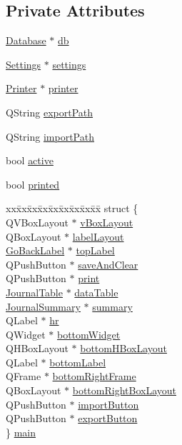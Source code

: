 \subsection*{Private Attributes}
\begin{CompactItemize}
\item 
\hyperlink{classDatabase}{Database} $\ast$ \hyperlink{classJournalStack_r0}{db}
\item 
\hyperlink{classSettings}{Settings} $\ast$ \hyperlink{classJournalStack_r1}{settings}
\item 
\hyperlink{classPrinter}{Printer} $\ast$ \hyperlink{classJournalStack_r2}{printer}
\item 
QString \hyperlink{classJournalStack_r3}{export\-Path}
\item 
QString \hyperlink{classJournalStack_r4}{import\-Path}
\item 
bool \hyperlink{classJournalStack_r5}{active}
\item 
bool \hyperlink{classJournalStack_r6}{printed}
\item 
\begin{tabbing}
xx\=xx\=xx\=xx\=xx\=xx\=xx\=xx\=xx\=\kill
struct \{\\
\>QVBoxLayout $\ast$ \hyperlink{classJournalStack_r7}{vBoxLayout}\\
\>QBoxLayout $\ast$ \hyperlink{classJournalStack_r8}{labelLayout}\\
\>\hyperlink{classGoBackLabel}{GoBackLabel} $\ast$ \hyperlink{classJournalStack_r9}{topLabel}\\
\>QPushButton $\ast$ \hyperlink{classJournalStack_r10}{saveAndClear}\\
\>QPushButton $\ast$ \hyperlink{classJournalStack_r11}{print}\\
\>\hyperlink{classJournalTable}{JournalTable} $\ast$ \hyperlink{classJournalStack_r12}{dataTable}\\
\>\hyperlink{classJournalSummary}{JournalSummary} $\ast$ \hyperlink{classJournalStack_r13}{summary}\\
\>QLabel $\ast$ \hyperlink{classJournalStack_r14}{hr}\\
\>QWidget $\ast$ \hyperlink{classJournalStack_r15}{bottomWidget}\\
\>QHBoxLayout $\ast$ \hyperlink{classJournalStack_r16}{bottomHBoxLayout}\\
\>QLabel $\ast$ \hyperlink{classJournalStack_r17}{bottomLabel}\\
\>QFrame $\ast$ \hyperlink{classJournalStack_r18}{bottomRightFrame}\\
\>QBoxLayout $\ast$ \hyperlink{classJournalStack_r19}{bottomRightBoxLayout}\\
\>QPushButton $\ast$ \hyperlink{classJournalStack_r20}{importButton}\\
\>QPushButton $\ast$ \hyperlink{classJournalStack_r21}{exportButton}\\
\} \hyperlink{classJournalStack_r22}{main}\\

\end{tabbing}\end{CompactItemize}


